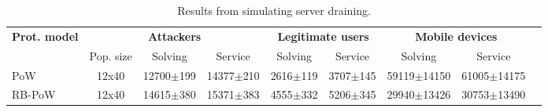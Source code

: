   \begin{table}[H]
    \centering
    \tiny
    \caption{Results from simulating server draining.}\label{tab:draining}

    \begin{tabularx}{1.05\textwidth}{lcccccccr} \toprule
      \multicolumn{1}{c}{\textbf{Prot. model}} & \multicolumn{3}{c}{\textbf{Attackers}} & \multicolumn{2}{c}{\textbf{Legitimate users}} & \multicolumn{2}{c}{\textbf{Mobile devices}} \\
      \multicolumn{1}{c}{} & \multicolumn{1}{c}{Pop. size} & \multicolumn{1}{c}{Solving} & \multicolumn{1}{c}{Service} & \multicolumn{1}{c}{Solving} & \multicolumn{1}{c}{Service} & \multicolumn{1}{c}{Solving} & \multicolumn{1}{c}{Service}  \\ \toprule
      PoW &  12x40  & 12700$\pm$199 & 14377$\pm$210 & 2616$\pm$119 & 3707$\pm$145 & 59119$\pm$14150 & 61005$\pm$14175    \\
      RB-PoW & 12x40 & 14615$\pm$380 & 15371$\pm$383 & 4555$\pm$332 & 5206$\pm$345 & 29940$\pm$13426 & 30753$\pm$13490   \\ \bottomrule
    \end{tabularx}
  \end{table}
